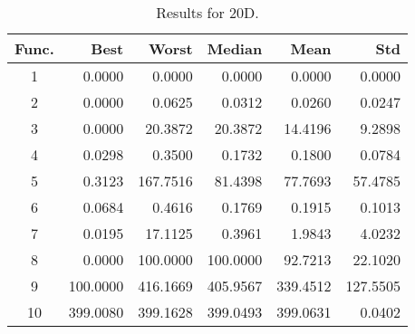 \begin{table}[ht]
\centering
\caption{ Results for 20D. }
\label{tab:20D}
\begin{tabular}{crrrrr}
\hline
{Func.} & Best & Worst & Median & Mean & Std \\
\hline
1 & 0.0000 & 0.0000 & 0.0000 & 0.0000 & 0.0000 \\
2 & 0.0000 & 0.0625 & 0.0312 & 0.0260 & 0.0247 \\
3 & 0.0000 & 20.3872 & 20.3872 & 14.4196 & 9.2898 \\
4 & 0.0298 & 0.3500 & 0.1732 & 0.1800 & 0.0784 \\
5 & 0.3123 & 167.7516 & 81.4398 & 77.7693 & 57.4785 \\
6 & 0.0684 & 0.4616 & 0.1769 & 0.1915 & 0.1013 \\
7 & 0.0195 & 17.1125 & 0.3961 & 1.9843 & 4.0232 \\
8 & 0.0000 & 100.0000 & 100.0000 & 92.7213 & 22.1020 \\
9 & 100.0000 & 416.1669 & 405.9567 & 339.4512 & 127.5505 \\
10 & 399.0080 & 399.1628 & 399.0493 & 399.0631 & 0.0402 \\
\hline
\end{tabular}
\end{table}
